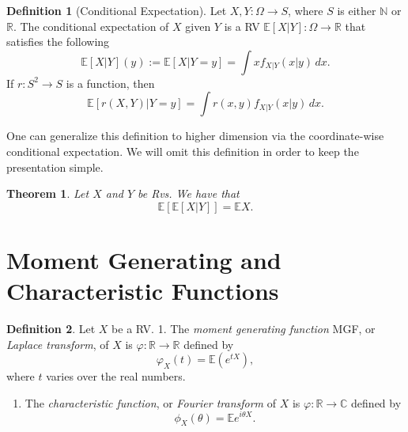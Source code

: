 \documentclass[
  openany]{book}
\providecommand{\tightlist}{%
  \setlength{\itemsep}{0pt}\setlength{\parskip}{0pt}}
\newtheorem{theorem}{Theorem}[chapter]
\theoremstyle{definition}
\newtheorem{definition}{Definition}[chapter]
\theoremstyle{definition}
\theoremstyle{definition}
\theoremstyle{definition}
\theoremstyle{remark}
\begin{document}
\begin{definition}[Conditional Expectation]
Let \(X,Y:\Omega \to S\), where \(S\) is either \(\mathbb{N}\) or \(\mathbb{R}\).
The conditional expectation of \(X\) given \(Y\) is a RV \(\mathbb{E}[X | Y] : \Omega \to \mathbb{R}\)
that satisfies the following
\[ \mathbb{E}[X | Y](y) := \mathbb{E}[X | Y = y] = \int x f_{X|Y}(x|y) \, dx . \]
If \(r:S^2 \to S\) is a function, then
\[ \mathbb{E}[r(X,Y) | Y = y] = \int r(x,y) f_{X|Y}(x|y) \, dx .\]
\end{definition}

One can generalize this definition to higher dimension via the coordinate-wise conditional
expectation. We will omit this definition in order to keep the presentation simple.

\begin{theorem}
Let \(X\) and \(Y\) be Rvs. We have that
\[ \mathbb{E}[ \mathbb{E}[X | Y]] = \mathbb{E}X. \]
\end{theorem}

\hypertarget{moment-generating-and-characteristic-functions}{%
\section{Moment Generating and Characteristic Functions}\label{moment-generating-and-characteristic-functions}}

\begin{definition}

Let \(X\) be a RV.
1. The \emph{moment generating function} MGF, or \emph{Laplace transform}, of \(X\) is \(\varphi: \mathbb{R}\to \mathbb{R}\) defined by
\[ \varphi_X (t) = \mathbb{E}\left( e^{t X}  \right),  \]
where \(t\) varies over the real numbers.

\begin{enumerate}
\def\labelenumi{\arabic{enumi}.}
\setcounter{enumi}{1}
\tightlist
\item
  The \emph{characteristic function}, or \emph{Fourier transform} of \(X\) is \(\varphi: \mathbb{R}\to \mathbb{C}\) defined by
  \[\phi_X(\theta) = \mathbb{E}e^{i\theta X} .\]
\end{enumerate}

\end{definition}
\end{document}
